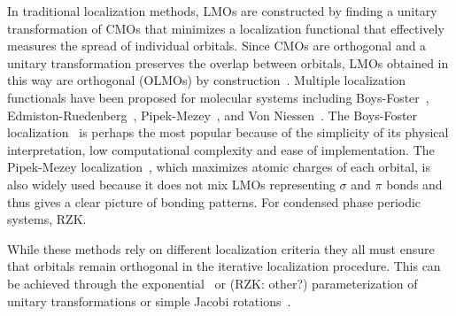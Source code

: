 \documentclass[aps,prl,reprint,amsmath,amssymb]{revtex4-1}
\begin{document}
In traditional localization methods, LMOs are constructed by finding a unitary transformation of CMOs that minimizes a localization functional that effectively measures the spread of individual orbitals. 
Since CMOs are orthogonal and a unitary transformation preserves the overlap between orbitals, LMOs obtained in this way are orthogonal (OLMOs) by construction~\cite{weinstein1971localized}.
Multiple localization functionals have been proposed for molecular systems including Boys-Foster~\cite{boys1960construction}, Edmiston-Ruedenberg~\cite{bytautas2002electron, bytautas2003split, edmiston1963localized}, Pipek-Mezey~\cite{pipek1989a_fast}, and Von Niessen~\cite{niessen1972density}. The Boys-Foster localization~\cite{boys1960construction} is perhaps the most popular because of the simplicity of its physical interpretation, low computational complexity and ease of implementation. 
The Pipek-Mezey localization~\cite{pipek1989a_fast}, which maximizes atomic charges of each orbital, is also widely used because it does not mix LMOs representing $\sigma$ and $\pi$ bonds and thus gives a clear picture of bonding patterns.
%
For condensed phase periodic systems, RZK.~\cite{marzari2012maximally}

While these methods rely on different localization criteria they all must ensure that orbitals remain orthogonal in the iterative localization procedure. This can be achieved through the exponential~\cite{RZK} or (RZK: other?) parameterization of unitary transformations or simple Jacobi rotations~\cite{RZK}.
\end{document}
